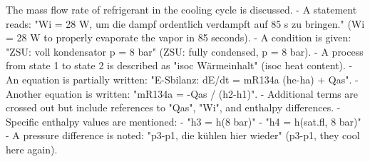 The mass flow rate of refrigerant in the cooling cycle is discussed.  
- A statement reads: "Wi = 28 W, um die dampf ordentlich verdampft auf 85 s zu bringen." (Wi = 28 W to properly evaporate the vapor in 85 seconds).  
- A condition is given: "ZSU: voll kondensator p = 8 bar" (ZSU: fully condensed, p = 8 bar).  
- A process from state 1 to state 2 is described as "isoc Wärmeinhalt" (isoc heat content).  
- An equation is partially written: "E-Sbilanz: dE/dt = mR134a (he-ha) + Qas".  
- Another equation is written: "mR134a = -Qas / (h2-h1)".  
- Additional terms are crossed out but include references to "Qas", "Wi", and enthalpy differences.  
- Specific enthalpy values are mentioned:  
  - "h3 = h(8 bar)"  
  - "h4 = h(sat.fl, 8 bar)"  
- A pressure difference is noted: "p3-p1, die kühlen hier wieder" (p3-p1, they cool here again).